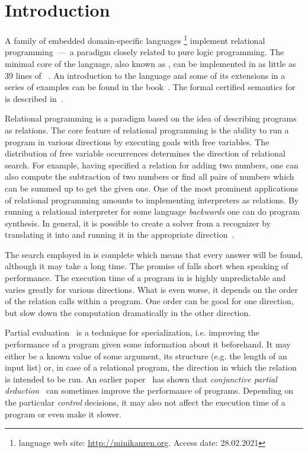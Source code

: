 \section{Introduction}
\label{intro}

A family of embedded domain-specific languages \mk\footnote{\mk language web site: \url{http://minikanren.org}. Access date: 28.02.2021} implement relational programming~---~a paradigm closely related to pure logic programming.
The minimal core of the language, also known as \muk, can be implemented in as little as 39 lines of \scheme~\cite{friedmanmukanren}.
An introduction to the language and some of its extensions in a series of examples can be found in the book~\cite{TheReasonedSchemer}.
The formal certified semantics for \mk is described in~\cite{rozplokhas2020certified}.

Relational programming is a paradigm based on the idea of describing programs as relations.
The core feature of relational programming is the ability to run a program in various directions by executing goals with free variables.
The distribution of free variable occurrences determines the direction of relational search.
For example, having specified a relation for adding two numbers, one can also compute the subtraction of two numbers or find all pairs of numbers which can be summed up to get the given one.
One of the most prominent applications of relational programming amounts to implementing interpreters as relations.
By running a relational interpreter for some language \emph{backwards} one can do program synthesis.
In general, it is possible to create a solver from a recognizer by translating it into \mk and running it in the appropriate direction~\cite{lozov2019relational}.

The search employed in \mk is complete which means that every answer will be found, although it may take a long time.
The promise of \mk falls short when speaking of performance.
The execution time of a program in \mk is highly unpredictable and varies greatly for various directions.
What is even worse, it depends on the order of the relation calls within a program.
One order can be good for one direction, but slow down the computation dramatically in the other direction.

Partial evaluation~\cite{jonesbook} is a technique for specialization, i.e. improving the performance of a program given some information about it beforehand.
It may either be a known value of some argument, its structure (e.g. the length of an input list) or, in case of a relational program, the direction in which the relation is intended to be run.
An earlier paper~\cite{lozov2019relational} has shown that \emph{conjunctive partial deduction}~\cite{de1999conjunctive} can sometimes improve the performance of \mk programs.
Depending on the particular \emph{control} decisions, it may also not affect the execution time of a program or even make it slower.

